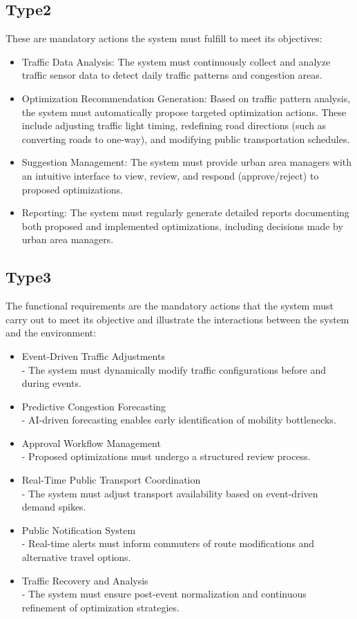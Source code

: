 \documentclass[a4paper,12pt]{article}
\begin{document}
\subsection*{Type2}
These are mandatory actions the system must fulfill to meet its objectives:
\begin{itemize}
\item Traffic Data Analysis:
The system must continuously collect and analyze traffic sensor data to detect daily traffic patterns and congestion areas.
\item Optimization Recommendation Generation:
Based on traffic pattern analysis, the system must automatically propose targeted optimization actions. These include adjusting traffic light timing, redefining road directions (such as converting roads to one-way), and modifying public transportation schedules.
\item Suggestion Management:
The system must provide urban area managers with an intuitive interface to view, review, and respond (approve/reject) to proposed optimizations.
\item Reporting:
The system must regularly generate detailed reports documenting both proposed and implemented optimizations, including decisions made by urban area managers.
\end{itemize}

\subsection*{Type3}
The functional requirements are the mandatory actions that the system must carry out to meet its objective and illustrate the interactions between the system and the environment:
\begin{itemize}
    \item{Event-Driven Traffic Adjustments} 
    \\- The system must dynamically modify traffic configurations before and during events.
    \item{Predictive Congestion Forecasting} 
    \\- AI-driven forecasting enables early identification of mobility bottlenecks.
    \item{Approval Workflow Management}
    \\- Proposed optimizations must undergo a structured review process.
    \item{Real-Time Public Transport Coordination}
    \\- The system must adjust transport availability based on event-driven demand spikes.
    \item{Public Notification System}
    \\- Real-time alerts must inform commuters of route modifications and alternative travel options.
    \item{Traffic Recovery and Analysis}
    \\- The system must ensure post-event normalization and continuous refinement of optimization strategies.
\end{itemize}
\end{document}
